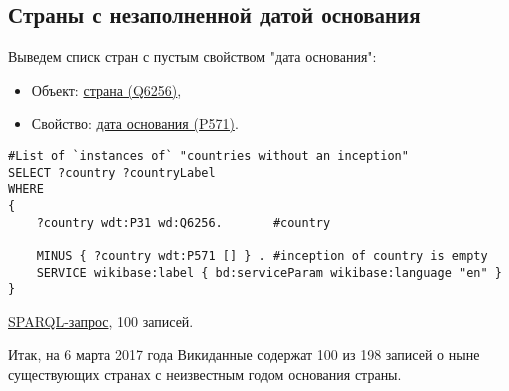 \subsection{Страны с незаполненной датой основания}

Выведем списк стран с пустым свойством "дата основания":

\begin{itemize}
    \item Объект: \href{https://www.wikidata.org/wiki/Q6256}{страна (Q6256)},
    \item Свойство: \href{https://www.wikidata.org/wiki/Property:P571}{дата основания (P571)}.
\end{itemize}

\begin{lstlisting}[language=SPARQL label=countrywithoutinception, caption=Список стран с пустым свойством "дата создания"]
#List of `instances of` "countries without an inception" 
SELECT ?country ?countryLabel 
WHERE
{
    ?country wdt:P31 wd:Q6256.       #country
    
    MINUS { ?country wdt:P571 [] } . #inception of country is empty
    SERVICE wikibase:label { bd:serviceParam wikibase:language "en" }
}
\end{lstlisting}

\href{https://query.wikidata.org/#%23List%20of%20%60instances%20of%60%20%22countries%20without%20a%20inception%22%20%0ASELECT%20%3Fcountry%20%3FcountryLabel%20%0AWHERE%0A%7B%0A%20%20%20%20%3Fcountry%20wdt%3AP31%20wd%3AQ6256.%20%23country%0A%20%20%20%20%0A%20%20%20%20MINUS%20%7B%20%3Fcountry%20wdt%3AP571%20%5B%5D%20%7D%20.%20%23inception%20of%20country%0A%20%20%20%20SERVICE%20wikibase%3Alabel%20%7B%20bd%3AserviceParam%20wikibase%3Alanguage%20%22en%22%20%7D%0A%7D%0A%0A}{SPARQL-запрос}, 100 записей.

Итак, на 6 марта 2017 года Викиданные содержат 100 из 198 записей о ныне существующих странах с неизвестным годом основания страны.